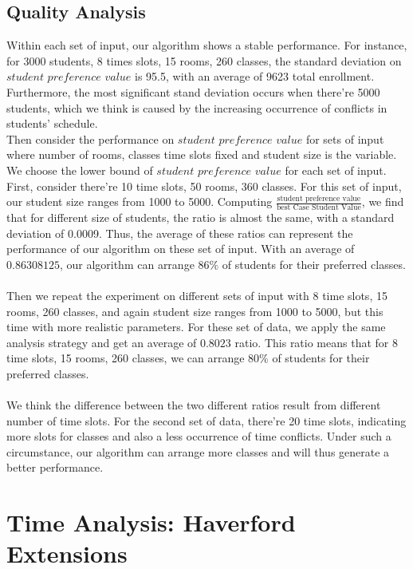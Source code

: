 \documentclass[11pt, oneside]{article}   	%
\begin{document}
\subsection{Quality Analysis}
Within each set of input, our algorithm shows a stable performance. For instance, for 3000 students, 8 times slots, 15 rooms, 260 classes, the standard deviation on $student$  $preference$  $value$ is 95.5, with an average of 9623 total enrollment. Furthermore, the most significant stand deviation occurs when there're 5000 students, which we think is caused by the increasing occurrence of conflicts in students' schedule. 
\\Then consider the performance on $student$ $preference$ $value$ for sets of input where number of rooms, classes time slots fixed and student size is the variable. We choose the lower bound of $student$ $preference$ $value$ for each set of input. First, consider there're 10 time slots, 50 rooms, 360 classes. For this set of input, our student size ranges from 1000 to 5000. Computing $\frac{\text{student preference value}}{\text{best Case Student Value}}$, we find that for different size of students, the ratio is almost the same, with a standard deviation of 0.0009. Thus, the average of these ratios can represent the performance of our algorithm on these set of input. With an average of $0.86308125$, our algorithm can arrange $86\%$ of students for their preferred classes.\\ \\Then we repeat the experiment on different sets of input with 8 time slots, 15 rooms, 260 classes, and again student size ranges from 1000 to 5000, but this time with more realistic parameters. For these set of data, we apply the same analysis strategy and get an average of $0.8023$ ratio. This ratio means that for 8 time slots, 15 rooms, 260 classes, we can arrange $80\%$ of students for their preferred classes.\\
\\We think the difference between the two different ratios result from different number of time slots. For the second set of data, there're 20 time slots, indicating more slots for classes and also a less occurrence of time conflicts. Under such a circumstance, our algorithm can arrange more classes and will thus generate a better performance.
\section{Time Analysis: Haverford Extensions}
\end{document}
